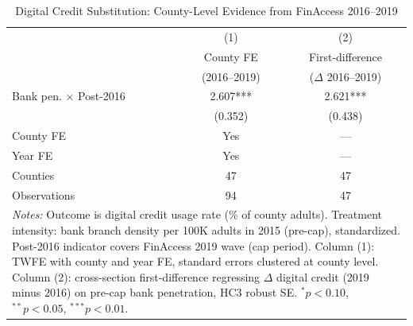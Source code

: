 \begin{table}[htbp]
\centering
\caption{Digital Credit Substitution: County-Level Evidence from FinAccess 2016--2019}
\label{tab:fintech}
\begin{tabular}{lcc}
\hline\hline
 & (1) & (2) \\
 & County FE & First-difference \\
 & (2016--2019) & ($\Delta$ 2016--2019) \\
\hline
  Bank pen. $\times$ Post-2016 & 2.607*** & 2.621*** \\
   & (0.352) & (0.438) \\
\hline
  County FE & Yes & --- \\
  Year FE & Yes & --- \\
  Counties & 47 & 47 \\
  Observations & 94 & 47 \\
\hline\hline
\multicolumn{3}{p{0.75\textwidth}}{\footnotesize \textit{Notes:} Outcome is digital credit usage rate (\% of county adults). Treatment intensity: bank branch density per 100K adults in 2015 (pre-cap), standardized. Post-2016 indicator covers FinAccess 2019 wave (cap period). Column (1): TWFE with county and year FE, standard errors clustered at county level. Column (2): cross-section first-difference regressing $\Delta$ digital credit (2019 minus 2016) on pre-cap bank penetration, HC3 robust SE. $^{*}p<0.10$, $^{**}p<0.05$, $^{***}p<0.01$.}
\end{tabular}
\end{table}
